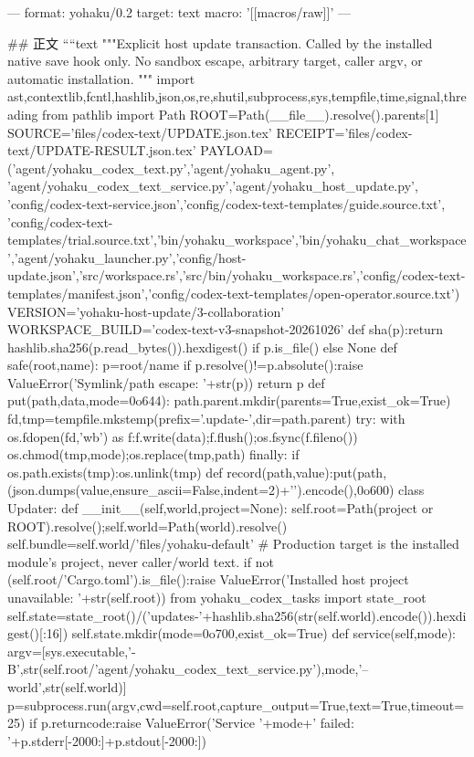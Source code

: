 ---
format: yohaku/0.2
target: text
macro: '[[macros/raw]]'
---

## 正文
````text
"""Explicit host update transaction. Called by the installed native save hook only.
No sandbox escape, arbitrary target, caller argv, or automatic installation.
"""
import ast,contextlib,fcntl,hashlib,json,os,re,shutil,subprocess,sys,tempfile,time,signal,threading
from pathlib import Path
ROOT=Path(__file__).resolve().parents[1]
SOURCE='files/codex-text/UPDATE.json.tex'
RECEIPT='files/codex-text/UPDATE-RESULT.json.tex'
PAYLOAD=('agent/yohaku_codex_text.py','agent/yohaku_agent.py',
 'agent/yohaku_codex_text_service.py','agent/yohaku_host_update.py',
 'config/codex-text-service.json','config/codex-text-templates/guide.source.txt',
 'config/codex-text-templates/trial.source.txt','bin/yohaku_workspace','bin/yohaku_chat_workspace','agent/yohaku_launcher.py','config/host-update.json','src/workspace.rs','src/bin/yohaku_workspace.rs','config/codex-text-templates/manifest.json','config/codex-text-templates/open-operator.source.txt')
VERSION='yohaku-host-update/3-collaboration'
WORKSPACE_BUILD='codex-text-v3-snapshot-20261026'
def sha(p):return hashlib.sha256(p.read_bytes()).hexdigest() if p.is_file() else None
def safe(root,name):
 p=root/name
 if p.resolve()!=p.absolute():raise ValueError('Symlink/path escape: '+str(p))
 return p
def put(path,data,mode=0o644):
 path.parent.mkdir(parents=True,exist_ok=True)
 fd,tmp=tempfile.mkstemp(prefix='.update-',dir=path.parent)
 try:
  with os.fdopen(fd,'wb') as f:f.write(data);f.flush();os.fsync(f.fileno())
  os.chmod(tmp,mode);os.replace(tmp,path)
 finally:
  if os.path.exists(tmp):os.unlink(tmp)
def record(path,value):put(path,(json.dumps(value,ensure_ascii=False,indent=2)+'\n').encode(),0o600)
class Updater:
 def __init__(self,world,project=None):
  self.root=Path(project or ROOT).resolve();self.world=Path(world).resolve()
  self.bundle=self.world/'files/yohaku-default'
  # Production target is the installed module's project, never caller/world text.
  if not (self.root/'Cargo.toml').is_file():raise ValueError('Installed host project unavailable: '+str(self.root))
  from yohaku_codex_tasks import state_root
  self.state=state_root()/('updates-'+hashlib.sha256(str(self.world).encode()).hexdigest()[:16])
  self.state.mkdir(mode=0o700,exist_ok=True)
 def service(self,mode):
  argv=[sys.executable,'-B',str(self.root/'agent/yohaku_codex_text_service.py'),mode,'--world',str(self.world)]
  p=subprocess.run(argv,cwd=self.root,capture_output=True,text=True,timeout=25)
  if p.returncode:raise ValueError('Service '+mode+' failed: '+p.stderr[-2000:]+p.stdout[-2000:])
